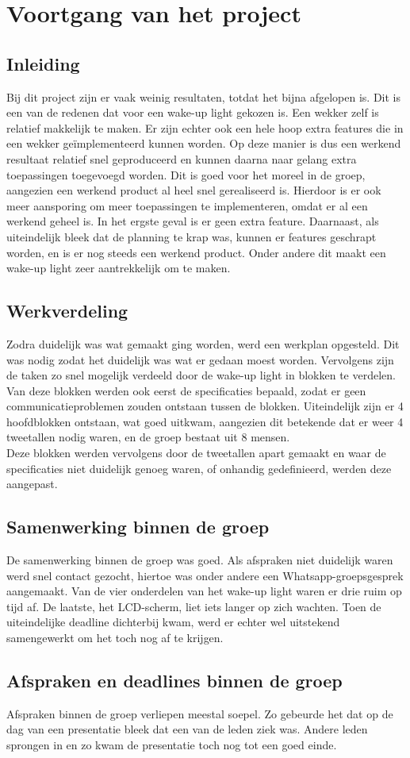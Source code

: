 \chapter{Voortgang van het project}

\section{Inleiding}
Bij dit project zijn er vaak weinig resultaten, totdat het bijna afgelopen is. 
Dit is een van de redenen dat voor een wake-up light gekozen is.
Een wekker zelf is relatief makkelijk te maken. 
Er zijn echter ook een hele hoop extra features die in een wekker ge\"implementeerd kunnen worden. 
Op deze manier is dus een werkend resultaat relatief snel geproduceerd en kunnen daarna naar gelang extra toepassingen toegevoegd worden. 
Dit is goed voor het moreel in de groep, aangezien een werkend product al heel snel gerealiseerd is.
Hierdoor is er ook meer aansporing om meer toepassingen te implementeren, omdat er al een werkend geheel is. 
In het ergste geval is er geen extra feature.
Daarnaast, als uiteindelijk bleek dat de planning te krap was, kunnen er features geschrapt worden, en is er nog steeds een werkend product. 
Onder andere dit maakt een wake-up light zeer aantrekkelijk om te maken.

\section{Werkverdeling}
Zodra duidelijk was wat gemaakt ging worden, werd een werkplan opgesteld.
Dit was nodig zodat het duidelijk was wat er gedaan moest worden.
Vervolgens zijn de taken zo snel mogelijk verdeeld door de wake-up light in blokken te verdelen. 
Van deze blokken werden ook eerst de specificaties bepaald, zodat er geen communicatieproblemen zouden ontstaan tussen de blokken.
Uiteindelijk zijn er 4 hoofdblokken ontstaan, wat goed uitkwam, aangezien dit betekende dat er weer 4 tweetallen nodig waren, en de groep bestaat uit 8 mensen. \\
Deze blokken werden vervolgens door de tweetallen apart gemaakt en waar de specificaties niet duidelijk genoeg waren, of onhandig gedefinieerd, werden deze aangepast. 


\section{Samenwerking binnen de groep}
De samenwerking binnen de groep was goed. Als afspraken niet duidelijk waren werd snel contact gezocht, hiertoe was onder andere een Whatsapp-groepsgesprek aangemaakt. Van de vier onderdelen van het wake-up light waren er drie ruim op tijd af. De laatste, het LCD-scherm, liet iets langer op zich wachten. Toen de uiteindelijke deadline dichterbij kwam, werd er echter wel uitstekend samengewerkt om het toch nog af te krijgen.


\section{Afspraken en deadlines binnen de groep}
Afspraken binnen de groep verliepen meestal soepel. Zo gebeurde het dat op de dag van een presentatie bleek dat een van de leden ziek was. Andere leden sprongen in en zo kwam de presentatie toch nog tot een goed einde. 
